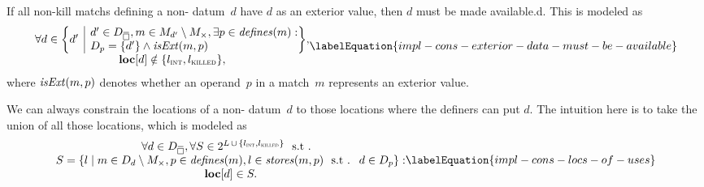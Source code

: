 If all non-\glspl{kill match} defining a non-
\gls{datum}~$d$ have $d$ as an \gls{exterior value}, then $d$ must be made
\gls{available.d}.
%
This is modeled as
%
\begin{equation}
  \begin{array}{@{}c@{}}
    \forall d \in
      \mSetBuilder*{d'}%
                   {%
                     \begin{array}{@{}l@{}}
                       d' \in \mStateDataCompSet,
                       m \in \mMatchSet[d'] \setminus \mKillMatchSet,
                       \exists p \in \mDefines(m) : \\
                       \mDataSet[p] = \mSet{d'} \mAnd \mIsExt(m, p)
                     \end{array}
                   } \!, \\
    \mVar{loc}[d] \notin \mSet{\mIntLocation, \mKilledLocation},
  \end{array}
  \labelEquation{impl-cons-exterior-data-must-be-available}
\end{equation}
%
where \mbox{$\operatorname{\textrm{\textit{isExt}}}(m, p)$} denotes whether an \gls{operand}~$p$ in a
\gls{match}~$m$ represents an \gls{exterior value}.

We can always constrain the \glspl{location} of a non-
\gls{datum}~$d$ to those \glspl{location} where the definers can put
$d$\hspace{-.8pt}.
%
The intuition here is to take the union of all those \glspl{location}, which is
modeled as
%
\begin{equation}
  \begin{array}{@{}c@{}}
    \forall d \in \mStateDataCompSet,
    \forall S \in
      \mPowerset{\mLocationSet
      \, \cup \,
      \mSet{\mIntLocation, \mKilledLocation}} \text{ \st} \\
    S = \mSetBuilder{l}%
                    {%
                      m \in \mDataSet[d] \setminus \mKillMatchSet,
                      p \in \mDefines(m),
                      l \in \mStores(m, p)
                      \text{ \st }
                      d \in \mDataSet[p]
                    } : \\
    \mVar{loc}[d] \in S.
  \end{array}
  \labelEquation{impl-cons-locs-of-uses}
\end{equation}

